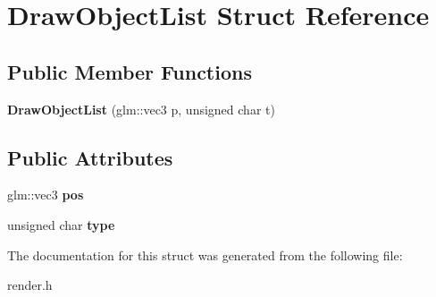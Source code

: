 \hypertarget{structDrawObjectList}{\section{\-Draw\-Object\-List \-Struct \-Reference}
\label{structDrawObjectList}
}
\subsection*{\-Public \-Member \-Functions}
\begin{DoxyCompactItemize}
\item 
\hypertarget{structDrawObjectList_a4f04a3efb4d346ec439413b60a60f735}{{\bfseries \-Draw\-Object\-List} (glm\-::vec3 p, unsigned char t)}\label{structDrawObjectList_a4f04a3efb4d346ec439413b60a60f735}

\end{DoxyCompactItemize}
\subsection*{\-Public \-Attributes}
\begin{DoxyCompactItemize}
\item 
\hypertarget{structDrawObjectList_a30b18bb8b60c5fe3135512468550236c}{glm\-::vec3 {\bfseries pos}}\label{structDrawObjectList_a30b18bb8b60c5fe3135512468550236c}

\item 
\hypertarget{structDrawObjectList_a8486a79ce9e68f04cd71ac2c0eff3f1e}{unsigned char {\bfseries type}}\label{structDrawObjectList_a8486a79ce9e68f04cd71ac2c0eff3f1e}

\end{DoxyCompactItemize}


\-The documentation for this struct was generated from the following file\-:\begin{DoxyCompactItemize}
\item 
render.\-h\end{DoxyCompactItemize}
